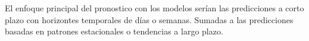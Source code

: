 
El enfoque principal del pronostico con los modelos serían las predicciones a corto plazo con horizontes temporales de días o semanas. Sumadas a las predicciones basadas en patrones estacionales o tendencias a largo plazo.





